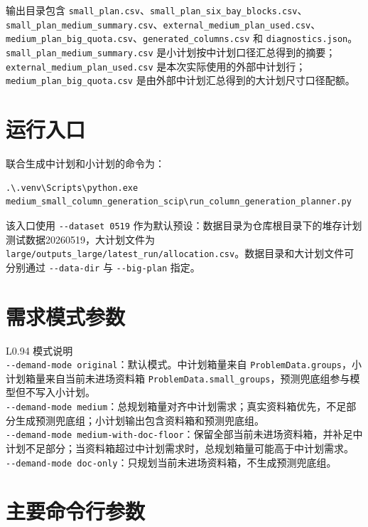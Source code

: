 \documentclass[UTF8,a4paper,11pt]{ctexart}
\newcommand{\code}[1]{\nolinkurl{#1}}
\begin{document}
输出目录包含 \code{small_plan.csv}、\code{small_plan_six_bay_blocks.csv}、\code{small_plan_medium_summary.csv}、\code{external_medium_plan_used.csv}、\code{medium_plan_big_quota.csv}、\code{generated_columns.csv} 和 \code{diagnostics.json}。\code{small_plan_medium_summary.csv} 是小计划按中计划口径汇总得到的摘要；\code{external_medium_plan_used.csv} 是本次实际使用的外部中计划行；\code{medium_plan_big_quota.csv} 是由外部中计划汇总得到的大计划尺寸口径配额。

\section{运行入口}

联合生成中计划和小计划的命令为：
\begin{lstlisting}
.\.venv\Scripts\python.exe medium_small_column_generation_scip\run_column_generation_planner.py
\end{lstlisting}

该入口使用 \code{--dataset 0519} 作为默认预设：数据目录为仓库根目录下的堆存计划测试数据20260519，大计划文件为 \code{large/outputs_large/latest_run/allocation.csv}。数据目录和大计划文件可分别通过 \code{--data-dir} 与 \code{--big-plan} 指定。

\section{需求模式参数}

\begin{longtable}{L{0.94\linewidth}}
\toprule
模式说明\\
\midrule
\code{--demand-mode original}：默认模式。中计划箱量来自 \code{ProblemData.groups}，小计划箱量来自当前未进场资料箱 \code{ProblemData.small_groups}，预测兜底组参与模型但不写入小计划。\\[0.25em]
\code{--demand-mode medium}：总规划箱量对齐中计划需求；真实资料箱优先，不足部分生成预测兜底组；小计划输出包含资料箱和预测兜底组。\\[0.25em]
\code{--demand-mode medium-with-doc-floor}：保留全部当前未进场资料箱，并补足中计划不足部分；当资料箱超过中计划需求时，总规划箱量可能高于中计划需求。\\[0.25em]
\code{--demand-mode doc-only}：只规划当前未进场资料箱，不生成预测兜底组。\\
\bottomrule
\end{longtable}

\section{主要命令行参数}
\end{document}
